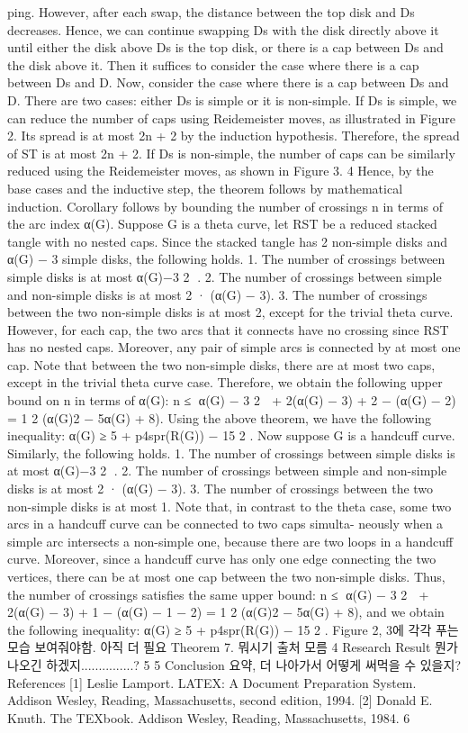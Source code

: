 ping. However, after each swap, the distance between the top disk and Ds decreases. Hence, we can continue
swapping Ds with the disk directly above it until either the disk above Ds is the top disk, or there is a cap
between Ds and the disk above it. Then it suffices to consider the case where there is a cap between Ds and
D.
Now, consider the case where there is a cap between Ds and D. There are two cases: either Ds is simple or
it is non-simple. If Ds is simple, we can reduce the number of caps using Reidemeister moves, as illustrated
in Figure 2. Its spread is at most 2n + 2 by the induction hypothesis. Therefore, the spread of ST is at most
2n + 2. If Ds is non-simple, the number of caps can be similarly reduced using the Reidemeister moves, as
shown in Figure 3.
4
Hence, by the base cases and the inductive step, the theorem follows by mathematical induction.
Corollary follows by bounding the number of crossings n in terms of the arc index α(G). Suppose G is a theta
curve, let RST be a reduced stacked tangle with no nested caps. Since the stacked tangle has 2 non-simple disks
and α(G) − 3 simple disks, the following holds.
1. The number of crossings between simple disks is at most α(G)−3
2
.
2. The number of crossings between simple and non-simple disks is at most 2 · (α(G) − 3).
3. The number of crossings between the two non-simple disks is at most 2, except for the trivial theta curve.
However, for each cap, the two arcs that it connects have no crossing since RST has no nested caps. Moreover, any
pair of simple arcs is connected by at most one cap. Note that between the two non-simple disks, there are at most
two caps, except in the trivial theta curve case. Therefore, we obtain the following upper bound on n in terms of
α(G):
n ≤
α(G) − 3
2

+ 2(α(G) − 3) + 2 − (α(G) − 2) = 1
2 (α(G)2 − 5α(G) + 8).
Using the above theorem, we have the following inequality:
α(G) ≥ 5 + p4spr(R(G)) − 15
2 .
Now suppose G is a handcuff curve. Similarly, the following holds.
1. The number of crossings between simple disks is at most α(G)−3
2
.
2. The number of crossings between simple and non-simple disks is at most 2 · (α(G) − 3).
3. The number of crossings between the two non-simple disks is at most 1.
Note that, in contrast to the theta case, some two arcs in a handcuff curve can be connected to two caps simulta-
neously when a simple arc intersects a non-simple one, because there are two loops in a handcuff curve. Moreover,
since a handcuff curve has only one edge connecting the two vertices, there can be at most one cap between the
two non-simple disks. Thus, the number of crossings satisfies the same upper bound:
n ≤
α(G) − 3
2

+ 2(α(G) − 3) + 1 − (α(G) − 1 − 2) = 1
2 (α(G)2 − 5α(G) + 8),
and we obtain the following inequality:
α(G) ≥ 5 + p4spr(R(G)) − 15
2 .
Figure 2, 3에 각각 푸는 모습 보여줘야함. 아직 더 필요
Theorem 7. 뭐시기 출처 모름
4 Research Result
뭔가 나오긴 하겠지...............?
5
5 Conclusion
요약, 더 나아가서 어떻게 써먹을 수 있을지?
References
[1] Leslie Lamport. LATEX: A Document Preparation System. Addison Wesley, Reading, Massachusetts, second
edition, 1994.
[2] Donald E. Knuth. The TEXbook. Addison Wesley, Reading, Massachusetts, 1984.
6